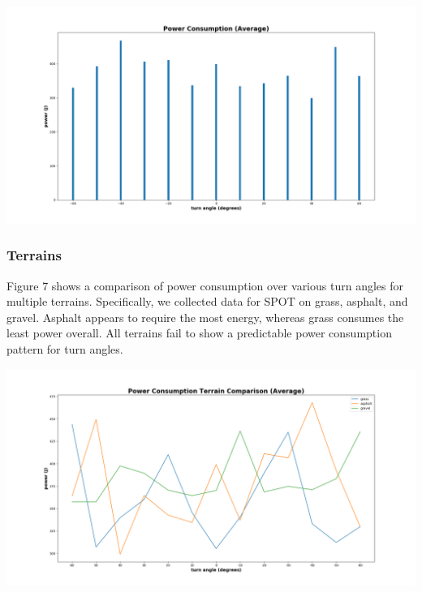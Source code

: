 \documentclass[conference]{IEEEtran}
\begin{document}
    \begin{adjustbox}{center, caption={Average Power Consumption per turn angle}, nofloat=figure}
        \includegraphics[width=1\linewidth]{power_avg.png}
    \end{adjustbox}
    
    \subsubsection{Terrains}
    Figure 7 shows a comparison of power consumption over various turn angles for multiple terrains. Specifically, we collected data for SPOT on grass, asphalt, and gravel. Asphalt appears to require the most energy, whereas grass consumes the least power overall. All terrains fail to show a predictable power consumption pattern for turn angles.
    
    \begin{adjustbox}{center, caption={Power Consumption terrain comparison}, nofloat=figure}
        \includegraphics[width=1\linewidth]{power_terrains.png}
    \end{adjustbox}
    
\end{document}
